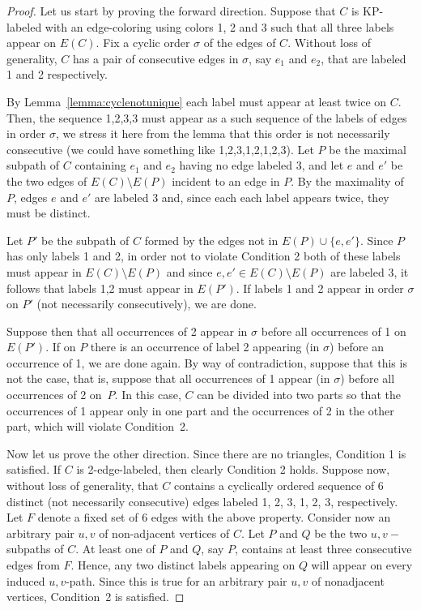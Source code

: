 \documentclass[12pt,a4paper,titlepage,openany]{report}
\begin{document}
\begin{proof}
Let us start by proving the forward direction. Suppose that $C$ is KP-labeled with an edge-coloring using colors 1, 2 and 3 such that all three labels appear on $E(C)$. Fix a cyclic order $\sigma$ of the edges of $C$. Without loss of generality, $C$ has a pair of consecutive edges in $\sigma$, say $e_1$ and $e_2$, that are labeled 1 and 2 respectively.

By Lemma~\ref{lemma:cyclenotunique} each label must appear at least twice on $C$. Then, the sequence 1,2,3,3 must appear as a such sequence of the labels of edges in order $\sigma$, we stress it here from the lemma that this order is not necessarily consecutive (we could have something like 1,2,3,1,2,1,2,3). Let $P$ be the maximal subpath of $C$ containing $e_1$ and $e_2$ having no edge labeled 3, and let $e$ and $e'$ be the two edges of $E(C)\setminus  E(P)$ incident to an edge in $P$. By the maximality of $P$, edges $e$ and $e'$ are labeled 3 and, since each each label appears twice, they must be distinct.

Let $P'$ be the subpath of $C$ formed by the edges not in $E(P)\cup \{ e,e'\}$. Since $P$ has only labels 1 and 2, in order not to violate Condition 2 both of these labels must appear in $E(C)\setminus  E(P)$ and since $e,e' \in E(C)\setminus  E(P)$ are labeled 3, it follows that labels 1,2 must appear in $E(P')$. If labels 1 and 2 appear in order $\sigma$ on $P'$ (not necessarily consecutively), we are done.

Suppose then that all occurrences of 2 appear in $\sigma$ before all occurrences of 1 on $E(P')$. If on $P$ there is an occurrence of label 2 appearing (in $\sigma$) before an occurrence of 1, we are done again. By way of contradiction, suppose that this is not the case, that is, suppose that all occurrences of 1 appear (in $\sigma$) before all occurrences of 2 on~$P$. In this case, $C$ can be divided into two parts so that the occurrences of 1 appear only in one part and the occurrences of 2 in the other part, which will violate Condition~2.

Now let us prove the other direction. Since there are no triangles, Condition 1 is satisfied. If $C$ is 2-edge-labeled, then clearly Condition 2 holds. Suppose now, without loss of generality, that $C$ contains a cyclically ordered sequence of 6 distinct (not necessarily consecutive) edges labeled 1, 2, 3, 1, 2, 3, respectively. Let $F$ denote a fixed set of 6 edges with the above property.
Consider now an arbitrary pair $u,v$ of non-adjacent vertices of $C$. Let $P$ and $Q$ be the two $u,v-$subpaths of $C$. At least one of $P$ and $Q$, say $P$, contains at least three consecutive edges from $F$. Hence, any two distinct labels appearing on $Q$ will appear on every induced $u,v$-path. Since this is true for an arbitrary pair $u,v$ of nonadjacent vertices, Condition~2 is satisfied.\qedhere
\end{proof}
\end{document}
